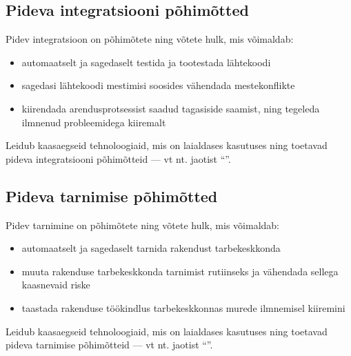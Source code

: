 \subsection{Pideva integratsiooni põhimõtted}\label{ci}
Pidev integratsioon on põhimõtete ning võtete hulk, mis võimaldab:

\begin{itemize}
  \item automaatselt ja sagedaselt testida ja tootestada lähtekoodi \cite{gitlab-what-are-pipelines}
  \item sagedasi lähtekoodi mestimisi soosides vähendada mestekonflikte \cite{gitlab-what-is-ci}
  \item kiirendada arendusprotsessist saadud tagasiside saamist, ning tegeleda ilmnenud probleemidega kiiremalt \cite{gitlab-what-is-ci}
\end{itemize}

Leidub kaasaegseid tehnoloogiaid, mis on laialdases kasutuses \cite{github-features-actions} ning toetavad pideva integratsiooni põhimõtteid — vt nt. jaotist “”.

\subsection{Pideva tarnimise põhimõtted}\label{cd}
Pidev tarnimine on põhimõtete ning võtete hulk, mis võimaldab:

\begin{itemize}
  \item automaatselt ja sagedaselt tarnida rakendust tarbekeskkonda \cite{gitlab-what-is-cd}
  \item muuta rakenduse tarbekeskkonda tarnimist rutiinseks ja vähendada sellega kaasnevaid riske \cite{gitlab-cicd-fundamentals}
  \item taastada rakenduse töökindlus tarbekeskkonnas murede ilmnemisel kiiremini \cite{gitlab-benefits-of-cicd}
\end{itemize}

Leidub kaasaegseid tehnoloogiaid, mis on laialdases kasutuses \cite{github-features-actions} ning toetavad pideva tarnimise põhimõtteid — vt nt. jaotist “”.

